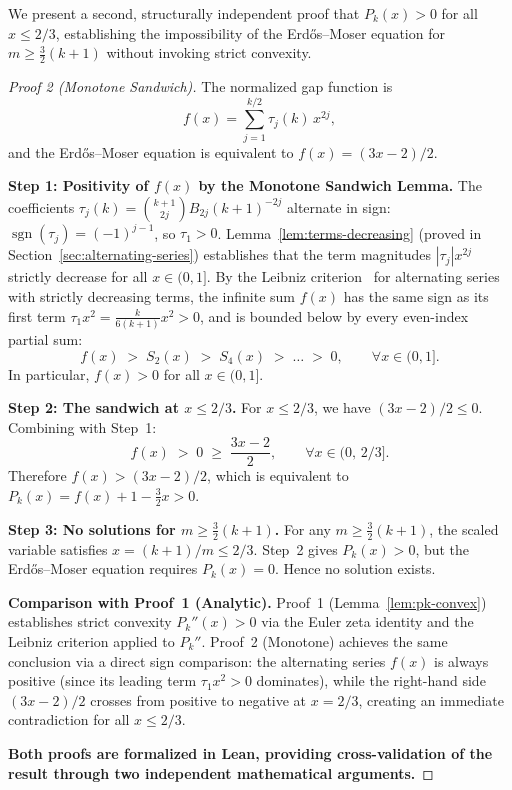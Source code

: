 \documentclass[12pt,a4paper]{article}
\theoremstyle{plain}
\theoremstyle{definition}
\begin{document}
We present a second, structurally independent proof that $P_k(x) > 0$ for
all $x \le 2/3$, establishing the impossibility of the Erd\H{o}s--Moser
equation for $m \ge \frac{3}{2}(k+1)$ without invoking strict convexity.
\begin{proof}[Proof 2 (Monotone Sandwich)]
  The normalized gap function is
  \[
    f(x) = \sum_{j=1}^{k/2} \tau_j(k) \, x^{2j},
  \]
  and the Erd\H{o}s--Moser equation is equivalent to $f(x) = (3x-2)/2$.

  \medskip
  \noindent\textbf{Step 1: Positivity of $f(x)$ by the Monotone Sandwich Lemma.}
  The coefficients $\tau_j(k) = \binom{k+1}{2j} B_{2j} (k+1)^{-2j}$ alternate
  in sign: $\operatorname{sgn}(\tau_j) = (-1)^{j-1}$, so $\tau_1 > 0$.
  Lemma~\ref{lem:terms-decreasing} (proved in Section~\ref{sec:alternating-series})
  establishes that the term magnitudes $|\tau_j| x^{2j}$ strictly decrease
  for all $x \in (0,1]$.
  By the Leibniz criterion~\cite{Leibniz} for
  alternating series with strictly decreasing terms, the infinite sum
  $f(x)$ has the same sign as its first term
  $\tau_1 x^2 = \frac{k}{6(k+1)} x^2 > 0$, and is bounded below by every
  even-index partial sum:
  \[
    f(x) \; > \; S_2(x) \; > \; S_4(x) \; > \; \dots \; > \; 0,
    \qquad \forall x \in (0, 1].
  \]
  In particular, $f(x) > 0$ for all $x \in (0, 1]$.

  \medskip
  \noindent\textbf{Step 2: The sandwich at $x \le 2/3$.}
  For $x \le 2/3$, we have $(3x-2)/2 \le 0$.  Combining with Step~1:
  \[
    f(x) \; > \; 0 \; \ge \; \frac{3x-2}{2},
    \qquad \forall x \in (0,\, 2/3].
  \]
  Therefore $f(x) > (3x-2)/2$, which is equivalent to
  $P_k(x) = f(x) + 1 - \frac{3}{2}x > 0$.

  \medskip
  \noindent\textbf{Step 3: No solutions for $m \ge \frac{3}{2}(k+1)$.}
  For any $m \ge \frac{3}{2}(k+1)$, the scaled variable satisfies
  $x = (k+1)/m \le 2/3$.  Step~2 gives $P_k(x) > 0$, but the Erd\H{o}s--Moser
  equation requires $P_k(x) = 0$.  Hence no solution exists.

  \medskip
  \noindent\textbf{Comparison with Proof~1 (Analytic).}
  Proof~1 (Lemma~\ref{lem:pk-convex}) establishes strict convexity
  $P_k''(x) > 0$ via the Euler zeta identity and the Leibniz criterion
  applied to $P_k''$.  Proof~2 (Monotone) achieves the same conclusion
  via a direct sign comparison: the alternating series $f(x)$ is always
  positive (since its leading term $\tau_1 x^2 > 0$ dominates), while the
  right-hand side $(3x-2)/2$ crosses from positive to negative at
  $x = 2/3$, creating an immediate contradiction for all $x \le 2/3$.

  \textbf{Both proofs are formalized in Lean, providing cross-validation
  of the result through two independent mathematical arguments.}
\end{proof}
\end{document}
